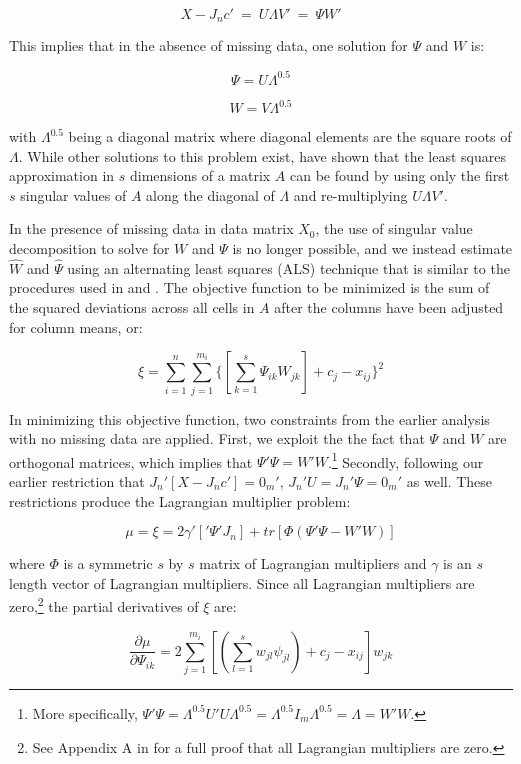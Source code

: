 \documentclass[nojss]{jss}
\begin{document}
$$X - J_nc'\ =\ U \Lambda V'\ =\ \Psi W'$$

This implies that in the absence of missing data, one solution for $\Psi$ and $W$ is:

$$\Psi = U\Lambda^{0.5}$$

$$W = V\Lambda^{0.5}$$

\noindent with $\Lambda^{0.5}$ being a diagonal matrix where diagonal elements are the square roots of $\Lambda$. While other solutions to this problem exist, \citet{eckart1936approximation} have shown that the least squares approximation in $s$ dimensions of a matrix $A$ can be found by using only the first $s$ singular values of $A$ along the diagonal of $\Lambda$ and re-multiplying $U \Lambda V'$.

In the presence of missing data in data matrix $X_0$, the use of singular value decomposition
to solve for $W$ and $\Psi$ is no longer possible, and we instead estimate $\hat{W}$ and
$\hat{\Psi}$ using an alternating least squares (ALS) technique that is similar to the procedures
used in \citet{carroll1970analysis} and \citet{takane1977nonmetric}. The objective
function to be minimized is the sum of the squared deviations across all cells in $A$ after
the columns have been adjusted for column means, or:

$$\xi = \displaystyle\sum\limits_{i=1}^n \sum\limits_{j=1}^{m_i} \{[ \sum\limits_{k=1}^s \Psi_{ik}W_{jk}] + c_j -x_{ij} \}^2$$

In minimizing this objective function, two constraints from the earlier analysis with no missing
data are applied. First, we exploit the the fact that $\Psi$ and $W$ are orthogonal matrices, which implies
that $\Psi'\Psi = W'W$.\footnote{More specifically, $\Psi'\Psi = \Lambda^{0.5}U'U\Lambda^{0.5} = \Lambda^{0.5}I_m\Lambda^{0.5} = \Lambda = W'W.$} Secondly, following our earlier restriction that $J_n'[X-J_nc'] = 0_m'$, $J_n'U = J_n'\Psi = 0_m'$ as well.
These restrictions produce the Lagrangian multiplier problem:


$$\mu = \xi = 2\gamma'['\Psi'J_n] + tr[\Phi(\Psi'\Psi - W'W)]$$

\noindent where $\Phi$ is a symmetric $s$ by $s$ matrix of Lagrangian multipliers and $\gamma$ is an $s$ length
vector of Lagrangian multipliers. Since all Lagrangian multipliers are zero,\footnote{See Appendix A in \citet{poole1998recovering}
for a full proof that all Lagrangian multipliers are zero.} the partial derivatives of $\xi$ are:

\begin{equation}
\frac{\partial \mu}{\partial \Psi_{ik}} = 2\displaystyle\sum\limits_{j=1}^{m_i} [(\sum\limits_{l=1}^s w_{jl}\psi_{jl})+ c_j - x_{ij}]w_{jk}
\label{three}
\end{equation}
\end{document}
